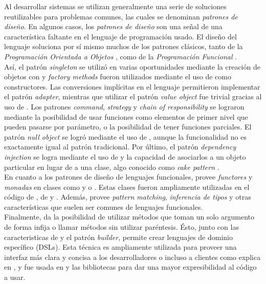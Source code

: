 Al desarrollar sistemas se utilizan generalmente una serie de soluciones 
reutilizables para problemas comunes, las cuales se denominan \emph{patrones de 
diseño}. En algunos casos, los \emph{patrones de diseño} son una señal de 
una característica faltante en el lenguaje de programación usado. El diseño del 
lenguaje \scala soluciona por sí mismo muchos de los patrones clásicos, tanto 
de la \emph{Programación Orientada a Objetos} , como de 
la \emph{Programación Funcional} .\\
Así, el patrón \emph{singleton} se utilizó en varias oportunidades mediante la 
creación de objetos con  y \emph{factory methods} fueron 
utilizados mediante el uso de  como constructores. Las conversiones 
implícitas en el lenguaje permitieron implementar el patrón \emph{adapter}, 
mientras que utilizar el patrón \emph{value object} fue trivial gracias al uso 
de . Los patrones \emph{command}, \emph{strategy} y 
\emph{chain of responsibility} se lograron mediante la posibilidad de usar 
funciones como elementos de primer nivel que pueden pasarse por parámetro, o la 
posibilidad de tener funciones parciales. El patrón \emph{null object} se logró 
mediante el uso de , aunque la funcionalidad no es exactamente 
igual al patrón tradicional. Por último, el patrón \emph{dependency injection} 
se logra mediante el uso de  y la capacidad de asociarlos a un 
objeto particular en lugar de a una clase, algo conocido como \emph{cake 
pattern} .\\
En cuanto a los patrones de diseño de lenguajes funcionales, \scala provee 
\emph{functores} y \emph{monadas} en clases como  y  o . Estas clases fueron ampliamente utilizadas en el código de \fronttier, de \scalavcs y \scaliapp. Además, \scala provee \emph{pattern matching}, \emph{inferencia de tipos} y  otras características que suelen ser comunes de lenguajes funcionales.\\
Finalmente, \scala da la posibilidad de utilizar métodos que toman un solo 
argumento de forma infija o llamar métodos sin utilizar paréntesis. Ésto, junto 
con las caracteristicas de  y el patrón \emph{builder}, 
permite crear lenguajes de dominio específico (DSLs). Esta técnica es 
ampliamente utilizada para proveer una interfaz más clara y concisa a los 
desarrolladores o incluso a clientes como explica 
\citeauthor{Venners:2009:ONLINE} en , y fue 
usada en \fronttier y las bibliotecas para dar una mayor expresibilidad al 
código a usar. 

